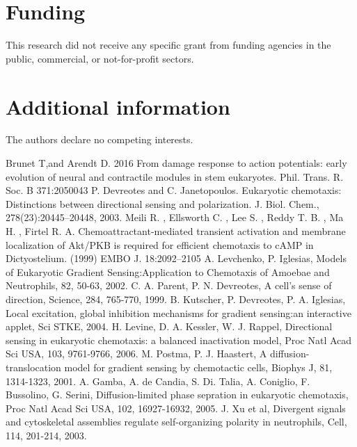 \documentclass[10pt,letterpaper]{article}
\begin{document}
\section*{Funding}
This research did not receive any specific grant from funding agencies in the public, commercial, or not-for-profit sectors.

\section*{Additional information}
The authors declare no competing interests. 





\nolinenumbers



 \begin{thebibliography}{}
Brunet T,and  Arendt D. 2016 From damage response to action potentials: early evolution of neural and contractile modules in stem eukaryotes. Phil. Trans. R. Soc. B 371:2050043
P. Devreotes and C. Janetopoulos. Eukaryotic chemotaxis: Distinctions between directional sensing and polarization. J. Biol. Chem., 278(23):20445–20448, 2003. 
Meili R. , Ellsworth C. , Lee S. , Reddy T. B. , Ma H. , Firtel R. A. Chemoattractant-mediated transient activation and
membrane localization of Akt/PKB is required for
efficient chemotaxis to cAMP in Dictyostelium. (1999) EMBO J. 18:2092–2105
 A. Levchenko, P. Iglesias, Models of Eukaryotic Gradient Sensing:Application to Chemotaxis of Amoebae and Neutrophils, 82, 50-63, 2002.
 C. A. Parent, P. N. Devreotes, A cell's sense of direction, Science, 284, 765-770, 1999.
 B. Kutscher, P. Devreotes, P. A. Iglesias, Local excitation, global inhibition mechanisms for gradient sensing:an interactive applet, Sci STKE, 2004.
 H. Levine, D. A. Kessler, W. J. Rappel, Directional sensing in eukaryotic  chemotaxis: a balanced inactivation model, Proc Natl Acad Sci USA, 103, 9761-9766, 2006.
 M. Postma, P. J. Haastert, A diffusion-translocation model for gradient sensing by chemotactic cells, Biophys J, 81, 1314-1323, 2001.
 A. Gamba, A. de Candia, S. Di. Talia, A. Coniglio, F. Bussolino, G. Serini, Diffusion-limited phase sepration in eukaryotic chemotaxis, Proc Natl Acad Sci USA, 102, 16927-16932, 2005.
  J. Xu et al, Divergent signals and cytoskeletal assemblies regulate self-organizing polarity in neutrophils, Cell, 114, 201-214, 2003.

\end{thebibliography}
\end{document}
